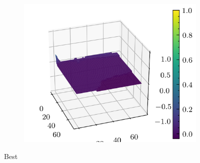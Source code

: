 \documentclass[../document.tex]{subfiles}
\begin{document}
\begin{figure}[H]
\begin{subfigure}[b]{0.19\textwidth}
        \includegraphics[width=\linewidth]{../img/5/quarry/best/patch-3d-4.png}
    \end{subfigure}  

\caption{Best}    
\end{figure}


\end{document}
